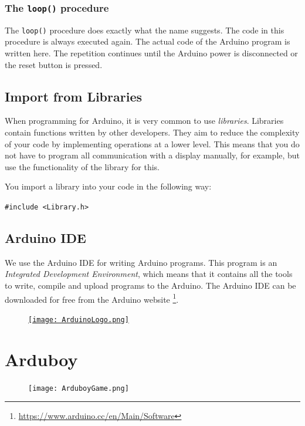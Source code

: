 \documentclass[11pt,fleqn]{book} %
\begin{document}
\subsection{The \texttt{loop()} procedure}
The \texttt{loop()} procedure does exactly what the name suggests. The code in this procedure is always executed again. The actual code of the Arduino program is written here. The repetition continues until the Arduino power is disconnected or the reset button is pressed.

\section{Import from Libraries}
When programming for Arduino, it is very common to use \emph{libraries}. Libraries contain functions written by other developers. They aim to reduce the complexity of your code by implementing operations at a lower level. This means that you do not have to program all communication with a display manually, for example, but use the functionality of the library for this.

\noindent
You import a library into your code in the following way:
\begin{center}
	\texttt{#include <Library.h>}
\end{center}

\section{Arduino IDE}
We use the Arduino IDE for writing Arduino programs. This program is an \emph {Integrated Development Environment}, which means that it contains all the tools to write, compile and upload programs to the Arduino. The Arduino IDE can be downloaded for free from the Arduino website \footnote{\url{https://www.arduino.cc/en/Main/Software}}.

\begin{figure}[!h]
	\centering
	\href{https://www.arduino.cc/en/Main/Software}{
		\texttt{[image: ArduinoLogo.png]}
	}
\end{figure}

\chapter{Arduboy}
\begin{figure}[!h]
	\centering
	\texttt{[image: ArduboyGame.png]}
\end{figure}
\end{document}
